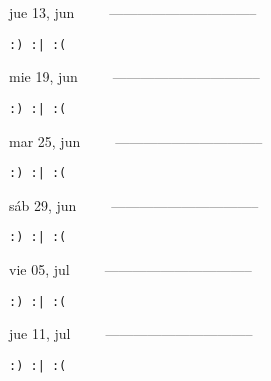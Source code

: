 \documentclass[letterpaper,10pt]{article}
\begin{document}
\begin{multicols}{3}
{jue 13, jun\ \ \ \ \ --------------------------------}
\begin{flushright}\begin{small}\texttt{:) :| :(}\end{small}\end{flushright}
\vfill
{mie 19, jun\ \ \ \ \ --------------------------------}
\begin{flushright}\begin{small}\texttt{:) :| :(}\end{small}\end{flushright}\par
\vfill
{mar 25, jun\ \ \ \ \ --------------------------------}
\begin{flushright}\begin{small}\texttt{:) :| :(}\end{small}\end{flushright}\par
\vfill
\end{multicols}
\vspace{1.05cm}

\begin{multicols}{3}
{sáb 29, jun\ \ \ \ \ --------------------------------}
\begin{flushright}\begin{small}\texttt{:) :| :(}\end{small}\end{flushright}
\vfill
{vie 05, jul\ \ \ \ \ --------------------------------}
\begin{flushright}\begin{small}\texttt{:) :| :(}\end{small}\end{flushright}\par
\vfill
{jue 11, jul\ \ \ \ \ --------------------------------}
\begin{flushright}\begin{small}\texttt{:) :| :(}\end{small}\end{flushright}\par
\vfill
\end{multicols}
\vspace{1.05cm}
\end{document}
